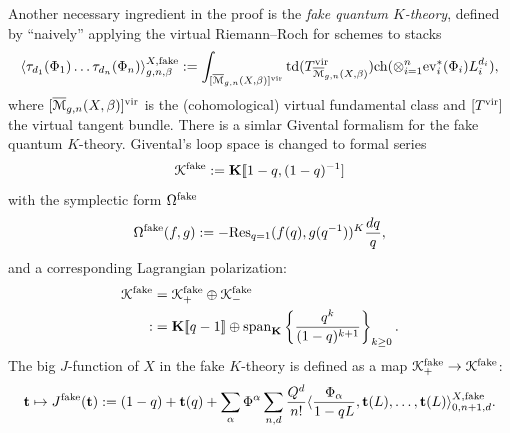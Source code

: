\documentclass[11pt]{amsart}
\newtheorem*{main theorem*}{Main Theorem}
\theoremstyle{remark}
\newtheorem{definition}[theorem]{Definition}
\numberwithin{equation}{section}
\newcommand{\M}{\overline{\mathcal{M}}}
\newcommand{\K}{\mathcal{K}}
\newcommand{\vir}{{\rm vir}}
\newcommand{\ev}{{\rm ev}}
\newcommand{\Res}{{\rm Res}}
\newcommand{\td}{{\rm td}}
\newcommand{\ch}{{\rm ch}}
\newcommand{\fake}{{\rm fake}}
\begin{document}
Another necessary ingredient in the proof is the \emph{fake quantum $K$-theory},  defined by ``naively'' applying the virtual Riemann--Roch for schemes to stacks
\[
\langle \tau_{d_1}(\Phi_1)\dots \tau_{d_n}(\Phi_n) \rangle^{X, \fake}_{g,n,\beta} := \int_{[\M_{g,n}(X,\beta)]^{\vir} } \td(T_{\M_{g,n}(X,\beta)}^{\vir}) \ch ( \otimes_{i=1}^n \ev_i^*(\Phi_i) L_i^{d_i} ),
\]
where $[\M_{g,n}(X,\beta)]^{\vir}$ is the (cohomological) virtual fundamental class and $[T^{\vir}]$ the virtual tangent bundle. %
There is a simlar Givental formalism for the fake quantum $K$-theory. Givental's loop space is changed to formal series
\[
\K^{\fake} := \mathbf{K}[\![ 1-q, (1-q)^{-1}]
\]
%
with the symplectic form $\Omega^{\fake}$
\[
\Omega^{\fake}(f,g) := - \Res_{q=1} (f(q), g(q^{-1}))^{K} \frac{dq}{q},
\]
and a corresponding Lagrangian polarization:
\[
\begin{split}
    \K^{\fake} &= \K_+^{\fake} \oplus \K_-^{\fake}
    \\
 : &= \mathbf{K}[\![q-1]\!] \oplus {\rm span}_{\mathbf{K}} \left\{ \frac{q^k}{(1-q)^{k+1}}  \right\}_{k \geq 0}.
\end{split}
\]
The big $J$-function of $X$ in the fake $K$-theory is defined as a map $\K_+^{\fake} \rightarrow \K^{\fake}$:
\[
\mathbf{t} \mapsto J^{\fake} (\mathbf{t}) := (1-q) + \mathbf{t}(q) + \sum_{\alpha} \Phi^{\alpha} \sum_{n,d} \frac{Q^d}{n!} 
\langle \frac{\Phi_{\alpha}}{1-qL}, \mathbf{t}(L),\dots,\mathbf{t}(L) \rangle ^{X,\fake}_{0,n+1,d}.
\]
\end{document}
